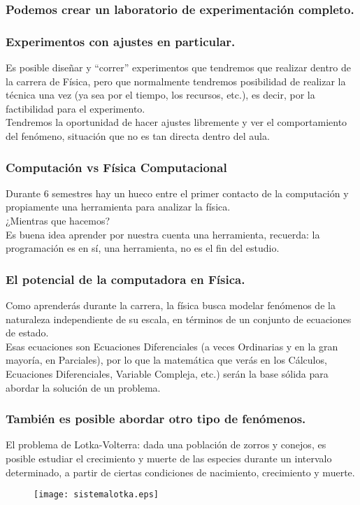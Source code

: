 \documentclass[12pt]{beamer}
\begin{document}
\begin{frame}
\frametitle{Podemos crear un laboratorio de experimentación completo.}

\end{frame}
\begin{frame}
\frametitle{Experimentos con ajustes en particular.}
Es posible diseñar y ``correr'' experimentos que tendremos que realizar dentro de la carrera de Física, pero que normalmente tendremos posibilidad de realizar la técnica una vez (ya sea por el tiempo, los recursos, etc.), es decir, por la factibilidad para el experimento.
\\
\bigskip
Tendremos la oportunidad de hacer ajustes libremente y ver el comportamiento del fenómeno, situación que no es tan directa dentro del aula.
\end{frame}
\begin{frame}
\frametitle{Computación vs Física Computacional}
Durante 6 semestres hay un hueco entre el primer contacto de la computación y propiamente una herramienta para analizar la física.
\\
\bigskip
¿Mientras que hacemos?
\pause
\\
\medskip
Es buena idea aprender por nuestra cuenta una herramienta, recuerda: la programación es en sí, una herramienta, no es el fin del estudio.
\end{frame}
\begin{frame}
\frametitle{El potencial de la computadora en Física.}
Como aprenderás durante la carrera, la física busca modelar fenómenos de la naturaleza independiente de su escala, en términos de un conjunto de ecuaciones de estado.
\\
\medskip
Esas ecuaciones son Ecuaciones Diferenciales (a veces Ordinarias y en la gran mayoría, en Parciales), por lo que la matemática que verás en los Cálculos, Ecuaciones Diferenciales, Variable Compleja, etc.) serán la base sólida para abordar la solución de un problema.
\end{frame}
\begin{frame}
\frametitle{También es posible abordar otro tipo de fenómenos.}
El problema de Lotka-Volterra: dada una población de zorros y conejos, es posible estudiar el crecimiento y muerte de las especies durante un intervalo determinado, a partir de ciertas condiciones de nacimiento, crecimiento y muerte.
\\
\begin{figure}
\centering
\texttt{[image: sistemalotka.eps]}
\end{figure}
\end{frame}
\end{document}
